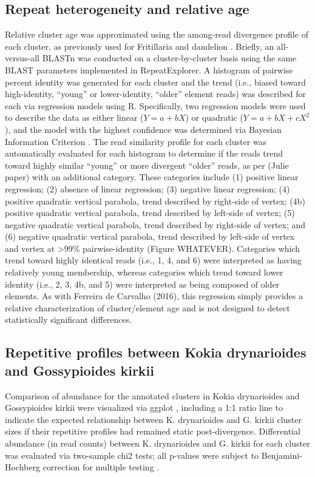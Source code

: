 \documentclass[10pt,letterpaper]{article}
\begin{document}
\subsection*{Repeat heterogeneity and relative age}
Relative cluster age was approximated using the among-read divergence profile of
each cluster, as previously used for Fritillaria \cite{Kelly2015} and dandelion
\cite{Ferreira2016}. Briefly, an all-versus-all BLASTn \cite{Boratyn2013,
  Altshul1990} was conducted on a cluster-by-cluster basis using the same BLAST
parameters implemented in RepeatExplorer. A histogram of pairwise percent
identity was generated for each cluster and the trend (i.e., biased toward
high-identity, “young” or lower-identity, “older” element reads) was described
for each via regression models using R. Specifically, two regression models were
used to describe the data as either linear ($Y = a + bX$) or quadratic
($Y = a + bX + cX^2$), and the model with the highest confidence was determined
via Bayesian Information Criterion \cite{Schwarz1978}. The read similarity
profile for each cluster was automatically evaluated for each histogram to
determine if the reads trend toward highly similar “young” or more divergent
“older” reads, as per (Julie paper) with an additional category. These
categories include (1) positive linear regression; (2) absence of linear
regression; (3) negative linear regression; (4) positive quadratic vertical
parabola, trend described by right-side of vertex; (4b) positive quadratic
vertical parabola, trend described by left-side of vertex; (5) negative
quadratic vertical parabola, trend described by right-side of vertex; and (6)
negative quadratic vertical parabola, trend described by left-side of vertex and
vertex at >99\% pairwise-identity (Figure WHATEVER). Categories which trend
toward highly identical reads (i.e., 1, 4, and 6) were interpreted as having
relatively young membership, whereas categories which trend toward lower
identity (i.e., 2, 3, 4b, and 5) were interpreted as being composed of older
elements. As with Ferreira de Carvalho (2016), this regression simply provides a
relative characterization of cluster/element age and is not designed to detect
statistically significant differences.

\subsection*{Repetitive profiles between Kokia drynarioides and Gossypioides kirkii}
Comparison of abundance for the annotated clusters in Kokia drynarioides and
Gossypioides kirkii were visualized via ggplot \cite{Wickham2016}, including a
1:1 ratio line to indicate the expected relationship between K. drynarioides and
G. kirkii cluster sizes if their repetitive profiles had remained static
post-divergence. Differential abundance (in read counts) between K. drynarioides
and G. kirkii for each cluster was evaluated via two-sample chi2 tests; all
p-values were subject to Benjamini-Hochberg correction for multiple testing
\cite{Benjamini2001}.
\end{document}
